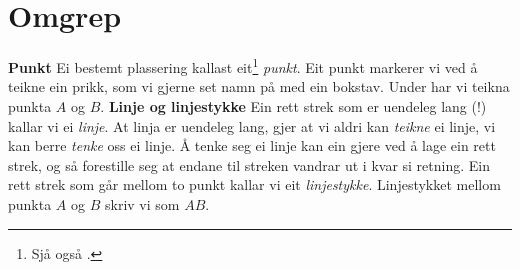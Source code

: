





\newpage
\section{Omgrep}
\textbf{Punkt}\os
Ei bestemt plassering kallast eit\footnote{Sjå også .} \textit{punkt}. Eit punkt markerer vi ved å teikne ein prikk, som vi gjerne set namn på med ein bokstav. Under har vi teikna punkta $ A $ og $ B $.
\textbf{Linje og linjestykke}\os
Ein rett strek som er uendeleg lang (!) kallar vi ei \textit{linje}. At linja er uendeleg lang, gjer at vi aldri kan \textsl{teikne} ei linje, vi kan berre \textsl{tenke} oss ei linje. Å tenke seg ei linje kan ein gjere ved å lage ein rett strek, og så forestille seg at endane til streken vandrar ut i kvar si retning.
Ein rett strek som går mellom to punkt kallar vi eit \textit{linjestykke}.
Linjestykket mellom punkta $ A $ og $ B $ skriv vi som $ AB $. \vsk

